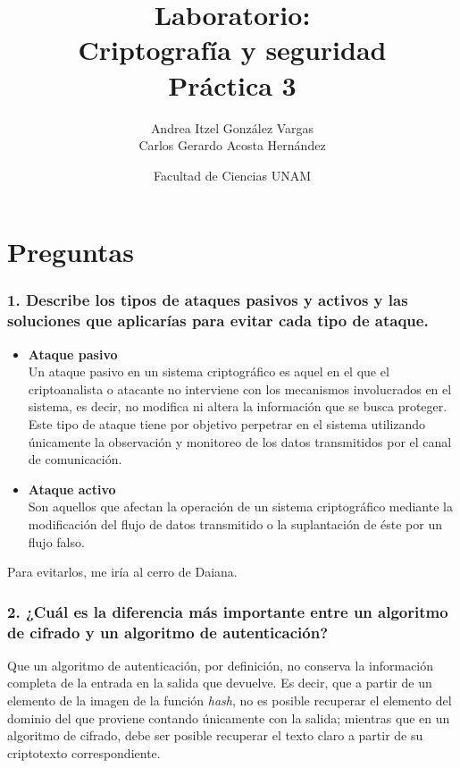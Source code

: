 \documentclass[12pt]{article}
\title{Laboratorio: \\Criptografía y seguridad \\ Práctica 3}
\author{Andrea Itzel González Vargas \\ Carlos Gerardo Acosta Hernández}
\date{Facultad de Ciencias UNAM}
\begin{document}
\maketitle
\section*{Preguntas}
\subsubsection*{1. Describe los tipos de ataques pasivos y activos y las soluciones que aplicarías para evitar cada tipo de ataque.}
\begin{itemize}
\item \textbf{Ataque pasivo}\\
  Un ataque pasivo en un sistema criptográfico es aquel en el que el
  criptoanalista o atacante no interviene con los mecanismos involucrados en el sistema, es decir, no modifica ni altera la información que se
  busca proteger. Este tipo de ataque tiene por objetivo perpetrar
  en el sistema utilizando únicamente la observación y monitoreo de
  los datos transmitidos por el canal de comunicación. 
\item \textbf{Ataque activo}\\
  Son aquellos que afectan la operación de un sistema criptográfico
  mediante la modificación del flujo de datos transmitido o la
  suplantación de éste por un flujo falso.
\end{itemize}
Para evitarlos, me iría al cerro de Daiana.
\subsubsection*{2. ¿Cuál es la diferencia más importante entre un algoritmo de cifrado y un algoritmo de autenticación?}
Que un algoritmo de autenticación, por definición, no conserva la información completa de la entrada en la salida que devuelve. Es decir, que
a partir de un elemento de la imagen de la función \textit{hash}, no es posible recuperar el elemento del dominio del que proviene contando únicamente con la salida;
mientras que en un algoritmo de cifrado, debe ser posible recuperar el texto claro a partir de su criptotexto correspondiente.
\end{document}
